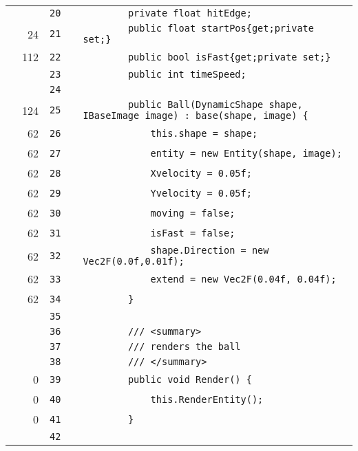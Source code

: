 \documentclass[a4paper,landscape,10pt]{article}
\begin{document}
\begin{longtable}[l]{lrrll}
\cellcolor{gray} &  & \verb~20~ & & \verb~        private float hitEdge;~\\
\cellcolor{green} & 24 & \verb~21~ & & \verb~        public float startPos{get;private set;}~\\
\cellcolor{green} & 112 & \verb~22~ & & \verb~        public bool isFast{get;private set;}~\\
\cellcolor{gray} &  & \verb~23~ & & \verb~        public int timeSpeed;~\\
\cellcolor{gray} &  & \verb~24~ & & \verb~~\\
\cellcolor{green} & 124 & \verb~25~ & & \verb~        public Ball(DynamicShape shape, IBaseImage image) : base(shape, image) {~\\
\cellcolor{green} & 62 & \verb~26~ & & \verb~            this.shape = shape;~\\
\cellcolor{green} & 62 & \verb~27~ & & \verb~            entity = new Entity(shape, image);~\\
\cellcolor{green} & 62 & \verb~28~ & & \verb~            Xvelocity = 0.05f;~\\
\cellcolor{green} & 62 & \verb~29~ & & \verb~            Yvelocity = 0.05f;~\\
\cellcolor{green} & 62 & \verb~30~ & & \verb~            moving = false;~\\
\cellcolor{green} & 62 & \verb~31~ & & \verb~            isFast = false;~\\
\cellcolor{green} & 62 & \verb~32~ & & \verb~            shape.Direction = new Vec2F(0.0f,0.01f);~\\
\cellcolor{green} & 62 & \verb~33~ & & \verb~            extend = new Vec2F(0.04f, 0.04f);~\\
\cellcolor{green} & 62 & \verb~34~ & & \verb~        }~\\
\cellcolor{gray} &  & \verb~35~ & & \verb~~\\
\cellcolor{gray} &  & \verb~36~ & & \verb~        /// <summary>~\\
\cellcolor{gray} &  & \verb~37~ & & \verb~        /// renders the ball~\\
\cellcolor{gray} &  & \verb~38~ & & \verb~        /// </summary>~\\
\cellcolor{red} & 0 & \verb~39~ & & \verb~        public void Render() {~\\
\cellcolor{red} & 0 & \verb~40~ & & \verb~            this.RenderEntity();~\\
\cellcolor{red} & 0 & \verb~41~ & & \verb~        }~\\
\cellcolor{gray} &  & \verb~42~ & & \verb~~\\

\end{longtable}
\end{document}
